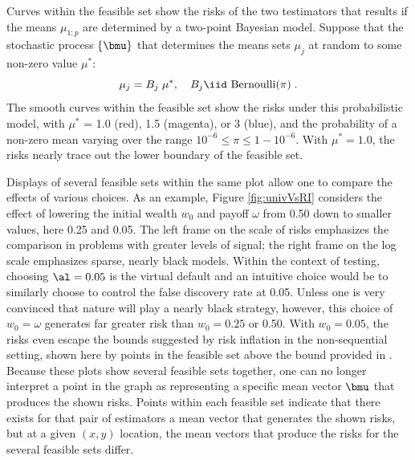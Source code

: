 \documentclass[12pt]{article}
\begin{document}
 Curves within the feasible set show the risks of the two testimators that
 results if the means $\mu_{1:p}$ are determined by a two-point Bayesian model.
  Suppose that the stochastic process $\{\bmu\}$ that determines the means sets
 $\mu_j$ at random to some non-zero value $\mu^{*}$:
 \begin{equation}
    \mu_j = B_j \; \mu^{*}, \quad B_j  \iid \mbox{ Bernoulli}(\pi)  \;.
 \label{eq:muj}
 \end{equation}
 The smooth curves within the feasible set show the risks under this
 probabilistic model, with $\mu^{*}$ = 1.0 (red), 1.5 (magenta), or 3 (blue),
 and the probability of a non-zero mean varying over the range $10^{-6} \le \pi
 \le 1-10^{-6}$.  With $\mu^{*} = 1.0$, the risks nearly trace out the lower
 boundary of the feasible set. 


 Displays of several feasible sets within the same plot allow one to compare the
 effects of various choices.  As an example, Figure \ref{fig:univVsRI} considers
 the effect of lowering the initial wealth $w_0$ and payoff $\omega$ from 0.50
 down to smaller values, here 0.25 and 0.05.  The left frame on the scale of
 risks emphasizes the comparison in problems with greater levels of signal; the
 right frame on the log scale emphasizes sparse, nearly black models.  Within
 the context of testing, choosing $\al=0.05$ is the virtual default and an
 intuitive choice would be to similarly choose to control the false discovery
 rate at 0.05.  Unless one is very convinced that nature will play a nearly
 black strategy, however, this choice of $w_0 = \omega$ generates far greater
 risk than $w_0=0.25$ or 0.50.  With $w_0=0.05$, the risks even escape the
 bounds suggested by risk inflation in the non-sequential setting, shown here by
 points in the feasible set above the bound provided in .  Because
 these plots show several feasible sets together, one can no longer interpret a
 point in the graph as representing a specific mean vector $\bmu$ that produces
 the shown risks.  Points within each feasible set indicate that there exists
 for that pair of estimators a mean vector that generates the shown risks, but
 at a given $(x,y)$ location, the mean vectors that produce the risks for the
 several feasible sets differ.
\end{document}
